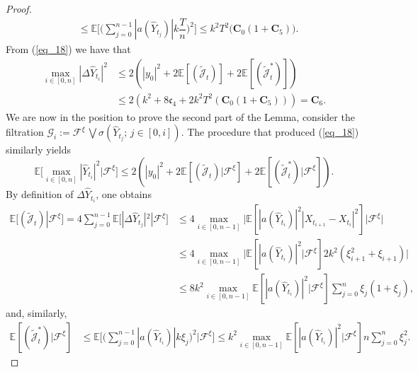 \begin{proof}
\begin{equation*}
\begin{split}
         &\leq \mathbb{E}\bigg[\bigg(\sum_{j=0}^{n-1} |a(\hat{Y}_{t_{j}})|k \dfrac{T}{n}\bigg)^2 \bigg]
         \leq k^2 T^2 \big(\mathbf{C}_0 (1 + \mathbf{C}_5) \big).
    \end{split}
\end{equation*}
From (\ref{eq_18}) we have that 
\begin{equation*}
    \begin{split}
        \max_{i \in [0, n]}|\Delta \hat{Y}_{t_{i}}|^2 &\leq 2(|y_0|^2 + 2 \mathbb{E}[(\tilde{\mathcal{J}}_t)] + 2 \mathbb{E}[(\tilde{\mathcal{J}}^{*}_t)])\\
        &\leq 2 (k^2 + 8 \mathfrak{c}_4 + 2 k^2 T^2 (\mathbf{C}_0 (1 + \mathbf{C}_5)))= \mathbf{C}_6.
    \end{split}
\end{equation*}
We are now in the position to prove the second part of the Lemma, consider the filtration $\mathcal{G}_{i} := \mathcal{F}^{\xi} \, \bigvee \sigma( \hat{Y}_{t_{j}} ; \,  j \in [0, i])$. The procedure that produced (\ref{eq_18}) similarly yields
\begin{equation*}
    \mathbb{E} \big[\max_{i \in [0, n]}|\hat{Y}_{t_i}|^2|\mathcal{F}^{\xi} \big] \leq 2(|y_0|^2 + 2 \mathbb{E}[(\tilde{\mathcal{J}}_t)|\mathcal{F}^{\xi}] + 2 \mathbb{E}[(\tilde{\mathcal{J}}^{*}_t) |\mathcal{F}^{\xi}]).
\end{equation*}
By definition of $\Delta \hat{Y}_{t_{i}}$, one obtains
\begin{equation}\label{eq19}
    \begin{split}
        \mathbb{E}[(\tilde{\mathcal{J}}_t)|\mathcal{F}^{\xi}] = 4  \sum_{j=0}^{n-1} \mathbb{E} \big[ |\Delta \hat{Y}_{t_{j}}|^2 |\mathcal{F}^{\xi} \big] 
        &\leq 4 \max_{i \in [0, n-1]} \big| \mathbb{E}[|a(\hat{Y}_{t_{i}})|^2 |X_{t_{i+1}} - X_{t_{i}}|^2] |\mathcal{F}^{\xi} \big|\\
        &\leq 4 \max_{i \in [0, n-1]} \big| \mathbb{E}[|a(\hat{Y}_{t_{i}})|^2 |\mathcal{F}^{\xi}] 2 k^2 (\xi_{i+1}^2 + \xi_{i+1}) \big|\\
        &\leq 8 k^2 \max_{i \in [0, n-1]} \mathbb{E}[|a(\hat{Y}_{t_{i}})|^2 |\mathcal{F}^{\xi}] \sum_{j=0}^{n} \xi_{j} (1 + \xi_{j}),
    \end{split}
\end{equation}
and, similarly,
\begin{equation}\label{eq20}
    \begin{split}
        \mathbb{E}[(\tilde{\mathcal{J}}^{*}_t) |\mathcal{F}^{\xi}] &\leq \mathbb{E}\bigg[\bigg(\sum_{j=0}^{n-1} |a(\hat{Y}_{t_{i}})|k \xi_{j} \bigg)^2 \bigg| \mathcal{F}^{\xi} \bigg] \leq k^2  \max_{i \in [0, n-1]} \mathbb{E}[|a(\hat{Y}_{t_{i}})|^2 |\mathcal{F}^{\xi}] n \sum_{j=0}^{n} \xi_{j}^2.

\end{split}
\end{equation}
\end{proof}

